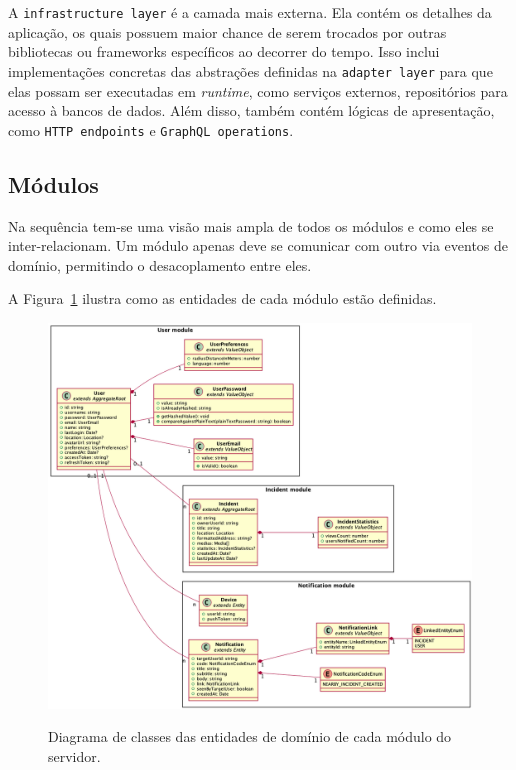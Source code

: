 A \texttt{infrastructure layer} é a camada mais externa. Ela contém os detalhes da aplicação, os quais possuem maior chance de serem trocados por outras bibliotecas ou frameworks específicos ao decorrer do tempo. Isso inclui implementações concretas das abstrações definidas na \texttt{adapter layer} para que elas possam ser executadas em \emph{runtime}, como serviços externos, repositórios para acesso à bancos de dados. Além disso, também contém lógicas de apresentação, como \texttt{HTTP endpoints} e \texttt{GraphQL operations}.

\subsection{Módulos}

Na sequência tem-se uma visão mais ampla de todos os módulos e como eles se inter-relacionam. Um módulo apenas deve se comunicar com outro via eventos de domínio, permitindo o desacoplamento entre eles.

A Figura~\ref{f.system_server_all-modules_domain-entities} ilustra como as entidades de cada módulo estão definidas. 

\begin{figure}[htbp]
	\caption{\small Diagrama de classes das entidades de domínio de cada módulo do servidor.}
	\centering
	\includegraphics[width=\textwidth]{../diagrams/out/system_server_all-modules_domain-entities.png}
	\label{f.system_server_all-modules_domain-entities}
\end{figure}

